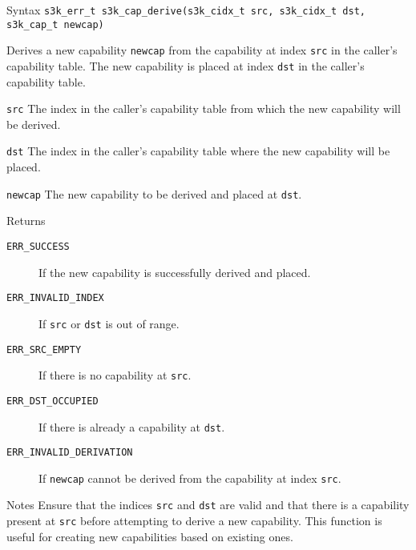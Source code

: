 \documentclass[a4paper,11pt]{article}
\newcommand{\syscall}[1]{\texttt{#1}}
\newenvironment{syscalldoc}[1]{
  \begin{tcolorbox}[breakable,title=\subsection{\syscall{#1}}]
  \begin{description}[leftmargin=!,style=nextline,noitemsep]
}{
  \end{description}
  \end{tcolorbox}
}
\begin{document}
\begin{syscalldoc}{s3k\_cap\_derive}
  \item[Syntax] \lstinline{s3k_err_t s3k_cap_derive(s3k_cidx_t src, s3k_cidx_t dst, s3k_cap_t newcap)}
  \item[Description]
	  Derives a new capability \verb|newcap| from the capability at index \verb|src| in the caller's capability table. The new capability is placed at index \verb|dst| in the caller's capability table.

  \item[Parameters]
    \begin{description}
      \item[]
      \item[\texttt{src}] The index in the caller's capability table from which the new capability will be derived.
      \item[\texttt{dst}] The index in the caller's capability table where the new capability will be placed.
      \item[\texttt{newcap}] The new capability to be derived and placed at \verb|dst|.
    \end{description}

  \item[Returns]
    \begin{description}
      \item[]
      \item[\texttt{ERR\_SUCCESS}] If the new capability is successfully derived and placed.
      \item[\texttt{ERR\_INVALID\_INDEX}] If \verb|src| or \verb|dst| is out of range.
      \item[\texttt{ERR\_SRC\_EMPTY}] If there is no capability at \verb|src|.
      \item[\texttt{ERR\_DST\_OCCUPIED}] If there is already a capability at \verb|dst|.
      \item[\texttt{ERR\_INVALID\_DERIVATION}] If \verb|newcap| cannot be derived from the capability at index \verb|src|.
    \end{description}

  \item[Notes]
	  Ensure that the indices \verb|src| and \verb|dst| are valid and that there is a capability present at \verb|src| before attempting to derive a new capability. This function is useful for creating new capabilities based on existing ones.
\end{syscalldoc}
\end{document}
